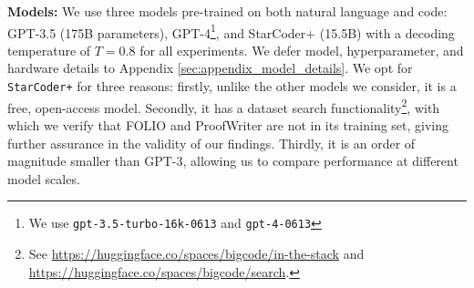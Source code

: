 \documentclass[11pt]{article}
\newcommand{\txo}[1]{\textcolor{blue}{}}
\newcommand{\txo}[1]{\textcolor{blue}{\bf\small [TXO: #1]}}
\newcommand{\TODO}{\textcolor{red}{\textbf{TODO}}}
\begin{document}

\textbf{Models:}
We use three models pre-trained on both natural language and code: GPT-3.5 (175B parameters), GPT-4\footnote{We use \texttt{gpt-3.5-turbo-16k-0613} and \texttt{gpt-4-0613}}, and StarCoder+ (15.5B) with a decoding temperature of $T=0.8$ for all experiments. We defer model, hyperparameter, and hardware details to Appendix \ref{sec:appendix_model_details}.
We opt for \texttt{StarCoder+} for three reasons: firstly, unlike the other models we consider, it is a free, open-access model. Secondly, it has a dataset search functionality\footnote{See \url{https://huggingface.co/spaces/bigcode/in-the-stack} and \url{https://huggingface.co/spaces/bigcode/search}.}, with which we verify that FOLIO and ProofWriter are not in its training set, giving further assurance in the validity of our findings. Thirdly, it is an order of magnitude smaller than GPT-3, allowing us to compare performance at different model scales.
\end{document}
